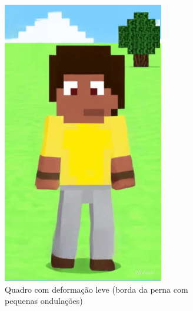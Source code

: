 \begin{figure}[htbp]
\begin{subfigure}{0.32\linewidth}
        \includegraphics[width=0.8\linewidth]{figs/vidu/1leve.png}
        \caption{\small Quadro com deformação leve (borda da perna com pequenas ondulações)}
        \label{fig:viduDeformacao1Leve}
    \end{subfigure}
    \begin{subfigure}{0.32\linewidth}
        \centering

\end{subfigure}
\end{figure}
